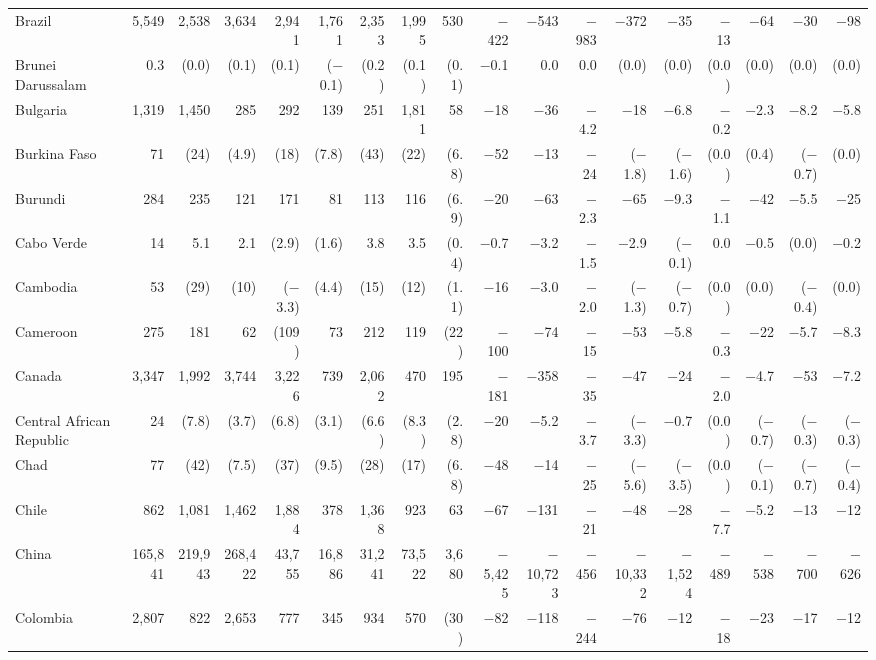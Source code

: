 \begin{longtable}{lrrrrrrrrrrrrrrrrr}
Brazil & 5,549 & 2,538 & 3,634 & 2,941 & 1,761 & 2,353 & 1,995 & 530 & $-$422 & $-$543 & $-$983 & $-$372 & $-$35 & $-$13 & $-$64 & $-$30 & $-$98 \\
Brunei Darussalam & 0.3 & (0.0) & (0.1) & (0.1) & ($-$0.1) & (0.2) & (0.1) & (0.1) & $-$0.1 & 0.0 & 0.0 & (0.0) & (0.0) & (0.0) & (0.0) & (0.0) & (0.0) \\
Bulgaria & 1,319 & 1,450 & 285 & 292 & 139 & 251 & 1,811 & 58 & $-$18 & $-$36 & $-$4.2 & $-$18 & $-$6.8 & $-$0.2 & $-$2.3 & $-$8.2 & $-$5.8 \\
Burkina Faso & 71 & (24) & (4.9) & (18) & (7.8) & (43) & (22) & (6.8) & $-$52 & $-$13 & $-$24 & ($-$1.8) & ($-$1.6) & (0.0) & (0.4) & ($-$0.7) & (0.0) \\
Burundi & 284 & 235 & 121 & 171 & 81 & 113 & 116 & (6.9) & $-$20 & $-$63 & $-$2.3 & $-$65 & $-$9.3 & $-$1.1 & $-$42 & $-$5.5 & $-$25 \\
Cabo Verde & 14 & 5.1 & 2.1 & (2.9) & (1.6) & 3.8 & 3.5 & (0.4) & $-$0.7 & $-$3.2 & $-$1.5 & $-$2.9 & ($-$0.1) & 0.0 & $-$0.5 & (0.0) & $-$0.2 \\
Cambodia & 53 & (29) & (10) & ($-$3.3) & (4.4) & (15) & (12) & (1.1) & $-$16 & $-$3.0 & $-$2.0 & ($-$1.3) & ($-$0.7) & (0.0) & (0.0) & ($-$0.4) & (0.0) \\
Cameroon & 275 & 181 & 62 & (109) & 73 & 212 & 119 & (22) & $-$100 & $-$74 & $-$15 & $-$53 & $-$5.8 & $-$0.3 & $-$22 & $-$5.7 & $-$8.3 \\
Canada & 3,347 & 1,992 & 3,744 & 3,226 & 739 & 2,062 & 470 & 195 & $-$181 & $-$358 & $-$35 & $-$47 & $-$24 & $-$2.0 & $-$4.7 & $-$53 & $-$7.2 \\
Central African Republic & 24 & (7.8) & (3.7) & (6.8) & (3.1) & (6.6) & (8.3) & (2.8) & $-$20 & $-$5.2 & $-$3.7 & ($-$3.3) & $-$0.7 & (0.0) & ($-$0.7) & ($-$0.3) & ($-$0.3) \\
Chad & 77 & (42) & (7.5) & (37) & (9.5) & (28) & (17) & (6.8) & $-$48 & $-$14 & $-$25 & ($-$5.6) & ($-$3.5) & (0.0) & ($-$0.1) & ($-$0.7) & ($-$0.4) \\
Chile & 862 & 1,081 & 1,462 & 1,884 & 378 & 1,368 & 923 & 63 & $-$67 & $-$131 & $-$21 & $-$48 & $-$28 & $-$7.7 & $-$5.2 & $-$13 & $-$12 \\
China & 165,841 & 219,943 & 268,422 & 43,755 & 16,886 & 31,241 & 73,522 & 3,680 & $-$5,425 & $-$10,723 & $-$456 & $-$10,332 & $-$1,524 & $-$489 & $-$538 & $-$700 & $-$626 \\
Colombia & 2,807 & 822 & 2,653 & 777 & 345 & 934 & 570 & (30) & $-$82 & $-$118 & $-$244 & $-$76 & $-$12 & $-$18 & $-$23 & $-$17 & $-$12 \\

\end{longtable}
